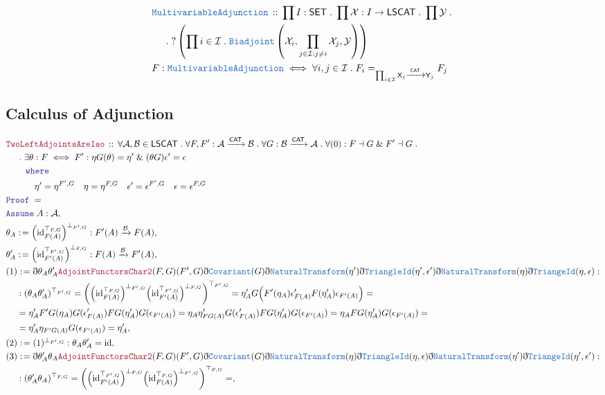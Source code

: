 \documentclass[12pt]{scrartcl}
\newcommand{\TYPE}[1]{\textcolor{NavyBlue}{\mathtt{#1}}}
\newcommand{\LOGIC}[1]{\textcolor{Blue}{\mathtt{#1}}}
\newcommand{\THM}[1]{\textcolor{Maroon}{\mathtt{#1}}}
\renewcommand{\.}{\; . \;}
\newcommand{\de}{: \kern 0.1pc =}
\newcommand{\where}{\LOGIC{where}}
\newcommand{\Theorem}[2]{& \THM{#1} \, :: \, #2 \\ & \Proof = \\ }
\newcommand{\DeclareType}[2]{& \TYPE{#1} \, :: \, #2 \\}
\newcommand{\DefineType}[3]{& #1 : \TYPE{#2} \iff #3 \\}
\newcommand{\NewLine}{\\ & \kern 1pc}
\newcommand{\Page}[1]{ \begin{align*} #1 \end{align*}   }
\newcommand{ \bd }{ \ByDef }
\renewcommand{\And}{\; \& \;}
\DeclareMathOperator*{\id}{id}
\newcommand{\Arrow}{\xrightarrow}
\newcommand{\Say}[3]{& #1 \de #2 : #3, \\}
\newcommand{\Assume}[2]{& \LOGIC{Assume} \; #1 : #2, \\}
\newcommand{\ByDef}{\eth}
\newcommand{\Proof}{\LOGIC{Proof} \; }
\newcommand{\Cov}{\TYPE{Covariant}}
\newcommand{\NT}{\TYPE{NaturalTransform}}
\newcommand{\A}{\mathcal{A}}
\newcommand{\B}{\mathcal{B}}
\newcommand{\I}{\mathcal{I}}
\newcommand{\CAT}{\mathsf{CAT}}
\newcommand{\SET}{\mathsf{SET}}
\begin{document}
\newpage
\Page{
	\DeclareType{MultivariableAdjunction}{
		\prod I : \SET \. 
		\prod \mathcal{X} : I \to \mathsf{LSCAT} \.  
		\prod \mathcal{Y} \. \NewLine \. 
		?\left( \prod i \in \I \. 
			\TYPE{Biadjoint}\left( \mathcal{X}_i,\prod_{j \in \I : j \neq i }\mathcal{X}_j, \mathcal{Y} \right) 
		\right)	
	}
	\DefineType{F}{MultivariableAdjunction}{
		\forall i,j \in \I \. 
		F_i =_{\prod_{i \in \I} \mathsf{X}_j \Arrow{\CAT} \mathsf{Y}_j } F_j
	}
}
\newpage
\subsection{Calculus of Adjunction}
\Page{
	\Theorem{TwoLeftAdjointsAreIso}{ 
		\forall \A,\B \in \mathsf{LSCAT} \. 
		\forall F,F' : \A \Arrow{\CAT} \B \.
		\forall G : \B \Arrow{\CAT} \A  \.
		\forall (0) : F \dashv G \And F' \dashv G  \. 
		\NewLine \.  \exists \theta : F \iff F' :
		\eta G(\theta)  = \eta' \And  (\theta G) \epsilon' = \epsilon  \NewLine
		\quad \where \NewLine 
		\quad \quad    \eta' = \eta^{F',G} 
		\quad \eta = \eta^{F,G} 
		\quad \epsilon' = \epsilon^{F',G}  
		\quad \epsilon = \epsilon^{F,G} 
	}
	\Assume{A}{\A}
	\Say{\theta_A}{ \Big({\id}_{F(A)}^{\top_{F,G}}\Big)^{\bot_{F',G}}}{  F'(A) \Arrow{\B} F(A)   } 
	\Say{\theta'_A}{ \Big( {\id}_{F'(A)}^{\top_{F',G}}\Big)^{\bot_{F,G}} }{ F(A) \Arrow{\B} F'(A) }
	\Say{(1)}{ 
		\bd \theta_A \theta_{A}' 
		\THM{AdjointFunctorsChar2}(F,G)(F',G) 
		\bd \Cov(G)
		\bd \NT(\eta')
		\bd \TYPE{TriangleId}(\eta', \epsilon')
		\bd \NT(\eta)
		\bd \TYPE{TriangeId}(\eta,\epsilon)
	}
	{  
			\NewLine :
			(\theta_A \theta'_A)^{\top_{F',G}} = 
			\bigg(\Big({\id}_{F(A)}^{\top_{F,G}}\Big)^{\bot_{F',G}}
			\Big({\id}_{F'(A)}^{\top_{F',G}}\Big)^{\bot_{F,G}} \bigg)^{\top_{F',G}} =    
			\eta'_{A} G\Big(F'(\eta_A)\epsilon'_{F(A)} F(\eta'_A)\epsilon_{F'(A)} \Big)  = \NewLine = 
			\eta'_{A} F'G(\eta_A) G(\epsilon'_{F(A)}) FG(\eta'_A)G(\epsilon_{F'(A)}) = 
			\eta_{A} \eta'_{FG(A)} G(\epsilon'_{F(A)}) FG(\eta'_A)G(\epsilon_{F'(A)}) = 
			\eta_{A} FG(\eta'_A)G(\epsilon_{F'(A)}) = \NewLine =
			\eta'_A \eta_{F'G(A)} G(\epsilon_{F'(A)}) =
			\eta'_A
		}
	\Say{(2)}{(1)^{\bot_{F',G}}}{ \theta_A \theta'_{A} = \id }
	\Say{(3)}{ 
		\bd \theta'_A \theta_{A} 
		\THM{AdjointFunctorsChar2}(F,G)(F',G) 
		\bd \Cov(G)
		\bd \NT(\eta)
		\bd \TYPE{TriangleId}(\eta, \epsilon)
		\bd \NT(\eta')
		\bd \TYPE{TriangeId}(\eta',\epsilon')
	}
	{  
			\NewLine :
			(\theta_A' \theta_A)^{\top_{F,G}} = 
			\bigg(\Big({\id}_{F'(A)}^{\top_{F',G}}\Big)^{\bot_{F,G}}
			\Big({\id}_{F(A)}^{\top_{F,G}}\Big)^{\bot_{F',G}} \bigg)^{\top_{F,G}} =    
}}
\end{document}
